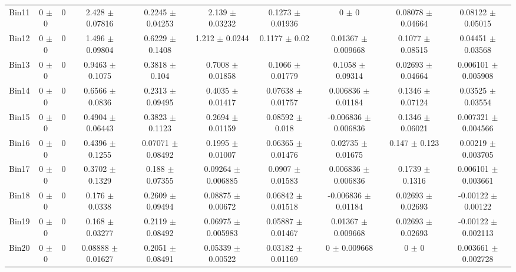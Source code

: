 \begin{tabular}{@{\extracolsep{4pt}}lccccccccc@{}}
     Bin11 & 0 $\pm$ 0 & 0 & 2.428 $\pm$ 0.07816 & 0.2245 $\pm$ 0.04253 & 2.139 $\pm$ 0.03232 & 0.1273 $\pm$ 0.01936 & 0 $\pm$ 0 & 0.08078 $\pm$ 0.04664 & 0.08122 $\pm$ 0.05015 \\ 
     Bin12 & 0 $\pm$ 0 & 0 & 1.496 $\pm$ 0.09804 & 0.6229 $\pm$ 0.1408 & 1.212 $\pm$ 0.0244 & 0.1177 $\pm$ 0.02 & 0.01367 $\pm$ 0.009668 & 0.1077 $\pm$ 0.08515 & 0.04451 $\pm$ 0.03568 \\ 
     Bin13 & 0 $\pm$ 0 & 0 & 0.9463 $\pm$ 0.1075 & 0.3818 $\pm$ 0.104 & 0.7008 $\pm$ 0.01858 & 0.1066 $\pm$ 0.01779 & 0.1058 $\pm$ 0.09314 & 0.02693 $\pm$ 0.04664 & 0.006101 $\pm$ 0.005908 \\ 
     Bin14 & 0 $\pm$ 0 & 0 & 0.6566 $\pm$ 0.0836 & 0.2313 $\pm$ 0.09495 & 0.4035 $\pm$ 0.01417 & 0.07638 $\pm$ 0.01757 & 0.006836 $\pm$ 0.01184 & 0.1346 $\pm$ 0.07124 & 0.03525 $\pm$ 0.03554 \\ 
     Bin15 & 0 $\pm$ 0 & 0 & 0.4904 $\pm$ 0.06443 & 0.3823 $\pm$ 0.1123 & 0.2694 $\pm$ 0.01159 & 0.08592 $\pm$ 0.018 & -0.006836 $\pm$ 0.006836 & 0.1346 $\pm$ 0.06021 & 0.007321 $\pm$ 0.004566 \\ 
     Bin16 & 0 $\pm$ 0 & 0 & 0.4396 $\pm$ 0.1255 & 0.07071 $\pm$ 0.08492 & 0.1995 $\pm$ 0.01007 & 0.06365 $\pm$ 0.01476 & 0.02735 $\pm$ 0.01675 & 0.147 $\pm$ 0.123 & 0.00219 $\pm$ 0.003705 \\ 
     Bin17 & 0 $\pm$ 0 & 0 & 0.3702 $\pm$ 0.1329 & 0.188 $\pm$ 0.07355 & 0.09264 $\pm$ 0.006885 & 0.0907 $\pm$ 0.01583 & 0.006836 $\pm$ 0.006836 & 0.1739 $\pm$ 0.1316 & 0.006101 $\pm$ 0.003661 \\ 
     Bin18 & 0 $\pm$ 0 & 0 & 0.176 $\pm$ 0.0338 & 0.2609 $\pm$ 0.09494 & 0.08875 $\pm$ 0.00672 & 0.06842 $\pm$ 0.01518 & -0.006836 $\pm$ 0.01184 & 0.02693 $\pm$ 0.02693 & -0.00122 $\pm$ 0.00122 \\ 
     Bin19 & 0 $\pm$ 0 & 0 & 0.168 $\pm$ 0.03277 & 0.2119 $\pm$ 0.08492 & 0.06975 $\pm$ 0.005983 & 0.05887 $\pm$ 0.01467 & 0.01367 $\pm$ 0.009668 & 0.02693 $\pm$ 0.02693 & -0.00122 $\pm$ 0.002113 \\ 
     Bin20 & 0 $\pm$ 0 & 0 & 0.08888 $\pm$ 0.01627 & 0.2051 $\pm$ 0.08491 & 0.05339 $\pm$ 0.00522 & 0.03182 $\pm$ 0.01169 & 0 $\pm$ 0.009668 & 0 $\pm$ 0 & 0.003661 $\pm$ 0.002728 \\ 
\hline\hline
  \end{tabular}
